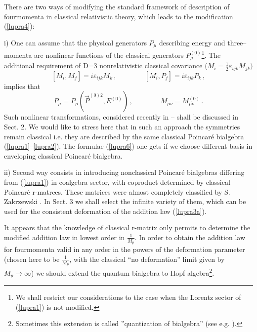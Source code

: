 \documentclass[a4paper,a4paper]{article}
\begin{document}
There are two ways of modifying the standard framework of
description of fourmomenta in classical relativistic theory,
which leads to the modification (\ref{lupra4}):

i) One can assume that the physical generators $P_\mu$ 
describing
energy and three--momenta are nonlinear functions of the classical
generators $P^{(0)}_\mu$\footnote{We shall restrict our
considerations to the case when the Lorentz sector of
(\ref{lupra1}) is not modified.}. The additional requirement of
D=3 nonrelativistic classical covariance ($M_i = \frac{1}{2}
\varepsilon_{ijk} M_{jk})$
\begin{equation}\label{lupra5}
  [M_i , M_j ] = i \varepsilon_{ijk}M_k \, , \qquad \qquad
  [M_i , P_j ] = i\varepsilon_{ijk}P_k \, ,
\end{equation}
implies that
\begin{equation}\label{lupra6}
P_\mu = P_\mu ( \overrightarrow{P}^{(0)2} , E^{(0)})\, ,\qquad
\qquad M_{\mu\nu} = M^{(0)}_{\mu\nu}\, .
\end{equation}
Such nonlinear transformations, considered recently in
\cite{ms}--\cite{ag} shall be discussed in Sect. 2. We would like
to stress here that in such an approach the symmetries remain
classical i.e. they are described by the  same classical
Poincar\'{e} bialgebra (\ref{lupra1}--\ref{lupra2}). The formulae
(\ref{lupra6}) one gets if we choose different basis  in
enveloping classical Poincar\'{e} bialgebra.

ii) Second way consists in introducing nonclassical Poincar\'{e}
bialgebras differing from (\ref{lupra1}) in coalgebra sector, with
coproduct determined by classical Poincar\'{e} r-matrces. These
matrices were almost completely classified by S. Zakrzewski
\cite{zak}. In Sect. 3 we shall select the infinite variety of
them, which can be used for the consistent deformation of the
addition law (\ref{lupra3a}).

 It appears that the knowledge of classical
r-matrix only permits to determine the modified addition law in
lowest order in $ \frac{1}{M_p}$. In order to    obtain  the
addition law for fourmomenta valid in any order in the powers of
 the deformation parameter (chosen here to be $ \frac{1}{M_p}$, 
with
the classical ``no deformation'' limit given by $M_p \to \infty$)
we should extend the quantum bialgebra to Hopf
algebra\footnote{Sometimes this extension is called ''quantization
of bialgebra'' (see e.g. \cite{ek}).}.
\end{document}
